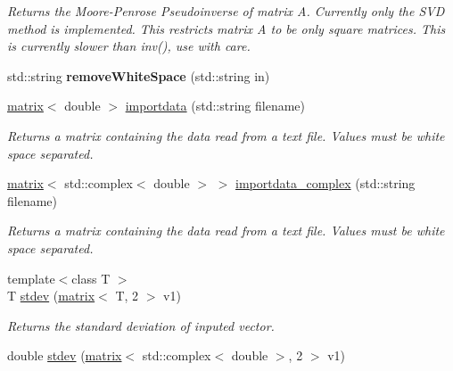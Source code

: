 \begin{DoxyCompactItemize}
\begin{DoxyCompactList}\small\item\em Returns the Moore-\/\-Penrose Pseudoinverse of matrix A. Currently only the S\-V\-D method is implemented. This restricts matrix A to be only square matrices. This is currently slower than inv(), use with care. \end{DoxyCompactList}\item 
\hypertarget{namespacekeycpp_ad70d9156c4b6a75e5b7a4c799f900162}{std\-::string {\bfseries remove\-White\-Space} (std\-::string in)}\label{namespacekeycpp_ad70d9156c4b6a75e5b7a4c799f900162}

\item 
\hypertarget{namespacekeycpp_ac5c0a8bc58229a412ec2068979b6b84e}{\hyperlink{classkeycpp_1_1matrix}{matrix}$<$ double $>$ \hyperlink{namespacekeycpp_ac5c0a8bc58229a412ec2068979b6b84e}{importdata} (std\-::string filename)}\label{namespacekeycpp_ac5c0a8bc58229a412ec2068979b6b84e}

\begin{DoxyCompactList}\small\item\em Returns a matrix containing the data read from a text file. Values must be white space separated. \end{DoxyCompactList}\item 
\hypertarget{namespacekeycpp_a126bda3ea87f21535d3a5da6587985dc}{\hyperlink{classkeycpp_1_1matrix}{matrix}$<$ std\-::complex$<$ double $>$ $>$ \hyperlink{namespacekeycpp_a126bda3ea87f21535d3a5da6587985dc}{importdata\-\_\-complex} (std\-::string filename)}\label{namespacekeycpp_a126bda3ea87f21535d3a5da6587985dc}

\begin{DoxyCompactList}\small\item\em Returns a matrix containing the data read from a text file. Values must be white space separated. \end{DoxyCompactList}\item 
\hypertarget{namespacekeycpp_ada4b54cb009afd7217ea23f1778021c1}{{\footnotesize template$<$class T $>$ }\\T \hyperlink{namespacekeycpp_ada4b54cb009afd7217ea23f1778021c1}{stdev} (\hyperlink{classkeycpp_1_1matrix}{matrix}$<$ T, 2 $>$ v1)}\label{namespacekeycpp_ada4b54cb009afd7217ea23f1778021c1}

\begin{DoxyCompactList}\small\item\em Returns the standard deviation of inputed vector. \end{DoxyCompactList}\item 
\hypertarget{namespacekeycpp_a3742d74c104a006f442440544dbc22e8}{double \hyperlink{namespacekeycpp_a3742d74c104a006f442440544dbc22e8}{stdev} (\hyperlink{classkeycpp_1_1matrix}{matrix}$<$ std\-::complex$<$ double $>$, 2 $>$ v1)}\label{namespacekeycpp_a3742d74c104a006f442440544dbc22e8}


\end{DoxyCompactItemize}
